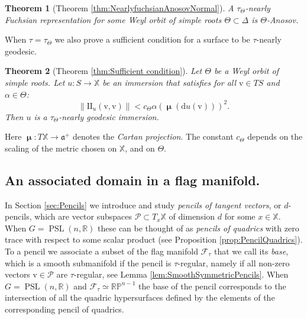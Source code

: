 \documentclass[reqno,10pt]{amsart}
\theoremstyle{plain}
\newtheorem{thm}{Theorem}[section]
\theoremstyle{definition}
\theoremstyle{remark}
\newcommand{\type}{\tau}
\newcommand{\R}{\mathbb{R}}
\DeclareMathOperator{\Cartan}{\boldsymbol{\mu}}
\DeclareMathOperator{\PSL}{PSL}
\newcommand{\II}{\mathrm{I\!I}}
\newcommand{\X}{\mathbb{X}}
\newcommand{\ie}{namely }
\begin{document}
\begin{thm}[Theorem \ref{thm:NearlyfuchsianAnosovNormal}]
\label{thm:NearlyfuchsianAnosovIntro2}
A $\type_\Theta$-nearly Fuchsian representation for some Weyl orbit of simple roots $\Theta\subset \Delta$ is $\Theta$-Anosov.
\end{thm}

When $\type=\type_\Theta$ we also prove a sufficient condition for a surface to be $\type$-nearly geodesic.

\begin{thm}[Theorem \ref{thm:Sufficient condition}]
Let $\Theta$ be a Weyl orbit of simple roots. Let $u:S\to \X$ be an immersion that satisfies for all $\mathrm{v}\in TS$ and $\alpha\in \Theta$:
\begin{equation}\label{eq:AlmostfuchsianIntro}\lVert\II_u(\mathrm{v},\mathrm{v}) \rVert<c_\Theta \alpha\left(\Cartan\left(\mathrm{d}u(\mathrm{v})\right)\right)^2.
\end{equation}
Then $u$ is a $\type_\Theta$-nearly geodesic immersion.
\end{thm}

Here $\Cartan:T\X\to \mathfrak{a}^+$ denotes the \emph{Cartan projection}. The constant $c_\Theta$ depends on the scaling of the metric chosen on $\X$, and on $\Theta$. 


\subsection{An associated domain in a flag manifold.}
In Section \ref{sec:Pencils} we introduce and study \emph{pencils of tangent vectors}, or $d$-pencils, which are vector subspaces $\mathcal{P}\subset T_x\X$ of dimension $d$ for some $x\in \X$. When $G=\PSL(n,\R)$ these can be thought of as \emph{pencils of quadrics} with zero trace with respect to some scalar product (see Proposition \ref{prop:PencilQuadrics}). To a pencil we associate a subset of the flag manifold $\mathcal{F}_\type$ that we call its \emph{base}, which is a smooth submanifold if the pencil is $\type$-regular, \ie if all non-zero vectors $\mathrm{v}\in \mathcal{P}$ are $\tau$-regular, see Lemma \ref{lem:SmoothSymmetricPencils}. When $G=\PSL(n,\R)$ and $\mathcal{F}_\type \simeq \mathbb{RP}^{n-1}$ the base of the pencil corresponds to the intersection of all the quadric hypersurfaces defined by the elements of the corresponding pencil of quadrics.
\end{document}
